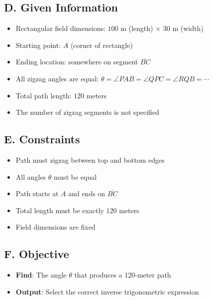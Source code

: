 \documentclass[11pt]{article}
\begin{document}
\begin{problembox}
\subsection*{D. Given Information}
\begin{itemize}[leftmargin=*]
    \item Rectangular field dimensions: $100$ m (length) $\times$ $30$ m (width)
    \item Starting point: $A$ (corner of rectangle)
    \item Ending location: somewhere on segment $\overline{BC}$
    \item All zigzag angles are equal: $\theta = \angle PAB = \angle QPC = \angle RQB = \cdots$
    \item Total path length: $120$ meters
    \item The number of zigzag segments is not specified
\end{itemize}

\subsection*{E. Constraints}
\begin{itemize}[leftmargin=*]
    \item Path must zigzag between top and bottom edges
    \item All angles $\theta$ must be equal
    \item Path starts at $A$ and ends on $\overline{BC}$
    \item Total length must be exactly $120$ meters
    \item Field dimensions are fixed
\end{itemize}

\subsection*{F. Objective}
\begin{itemize}[leftmargin=*]
    \item \textbf{Find}: The angle $\theta$ that produces a $120$-meter path
    \item \textbf{Output}: Select the correct inverse trigonometric expression
\end{itemize}


\end{problembox}
\end{document}
